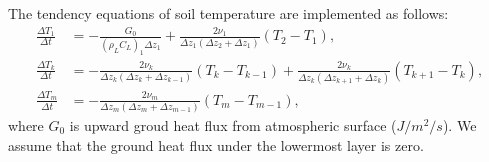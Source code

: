 The tendency equations of soil temperature are implemented as follows:
\begin{align}
  \frac{\Delta T_{1}}{\Delta t} &= - \frac{G_{0}}{(\rho_{L}C_{L})_{1}\Delta z_{1}} + \frac{2\nu_{1}}{\Delta z_{1}(\Delta z_{2}+\Delta z_{1})} (T_{2}-T_{1}), \\
  \frac{\Delta T_{k}}{\Delta t} &= - \frac{2\nu_{k}}{\Delta z_{k}(\Delta z_{k}+\Delta z_{k-1})} (T_{k}-T_{k-1}) + \frac{2\nu_{k}}{\Delta z_{k}(\Delta z_{k+1}+\Delta z_{k})} (T_{k+1}-T_{k}), \\
  \frac{\Delta T_{m}}{\Delta t} &= - \frac{2\nu_{m}}{\Delta z_{m}(\Delta z_{m}+\Delta z_{m-1})} (T_{m}-T_{m-1}),
\end{align}
where $G_{0}$ is upward groud heat flux from atmospheric surface ($J/m^2/s$).
We assume that the ground heat flux under the lowermost layer is zero.

